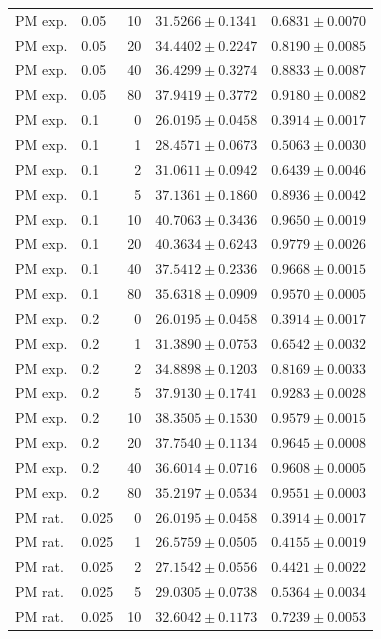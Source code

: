 \begin{longtable}{llrll}
PM exp. & 0.05 & 10 & $31.5266 \pm 0.1341$ & $0.6831 \pm 0.0070$ \\
PM exp. & 0.05 & 20 & $34.4402 \pm 0.2247$ & $0.8190 \pm 0.0085$ \\
PM exp. & 0.05 & 40 & $36.4299 \pm 0.3274$ & $0.8833 \pm 0.0087$ \\
PM exp. & 0.05 & 80 & $37.9419 \pm 0.3772$ & $0.9180 \pm 0.0082$ \\
PM exp. & 0.1 & 0 & $26.0195 \pm 0.0458$ & $0.3914 \pm 0.0017$ \\
PM exp. & 0.1 & 1 & $28.4571 \pm 0.0673$ & $0.5063 \pm 0.0030$ \\
PM exp. & 0.1 & 2 & $31.0611 \pm 0.0942$ & $0.6439 \pm 0.0046$ \\
PM exp. & 0.1 & 5 & $37.1361 \pm 0.1860$ & $0.8936 \pm 0.0042$ \\
PM exp. & 0.1 & 10 & $40.7063 \pm 0.3436$ & $0.9650 \pm 0.0019$ \\
PM exp. & 0.1 & 20 & $40.3634 \pm 0.6243$ & $0.9779 \pm 0.0026$ \\
PM exp. & 0.1 & 40 & $37.5412 \pm 0.2336$ & $0.9668 \pm 0.0015$ \\
PM exp. & 0.1 & 80 & $35.6318 \pm 0.0909$ & $0.9570 \pm 0.0005$ \\
PM exp. & 0.2 & 0 & $26.0195 \pm 0.0458$ & $0.3914 \pm 0.0017$ \\
PM exp. & 0.2 & 1 & $31.3890 \pm 0.0753$ & $0.6542 \pm 0.0032$ \\
PM exp. & 0.2 & 2 & $34.8898 \pm 0.1203$ & $0.8169 \pm 0.0033$ \\
PM exp. & 0.2 & 5 & $37.9130 \pm 0.1741$ & $0.9283 \pm 0.0028$ \\
PM exp. & 0.2 & 10 & $38.3505 \pm 0.1530$ & $0.9579 \pm 0.0015$ \\
PM exp. & 0.2 & 20 & $37.7540 \pm 0.1134$ & $0.9645 \pm 0.0008$ \\
PM exp. & 0.2 & 40 & $36.6014 \pm 0.0716$ & $0.9608 \pm 0.0005$ \\
PM exp. & 0.2 & 80 & $35.2197 \pm 0.0534$ & $0.9551 \pm 0.0003$ \\
PM rat. & 0.025 & 0 & $26.0195 \pm 0.0458$ & $0.3914 \pm 0.0017$ \\
PM rat. & 0.025 & 1 & $26.5759 \pm 0.0505$ & $0.4155 \pm 0.0019$ \\
PM rat. & 0.025 & 2 & $27.1542 \pm 0.0556$ & $0.4421 \pm 0.0022$ \\
PM rat. & 0.025 & 5 & $29.0305 \pm 0.0738$ & $0.5364 \pm 0.0034$ \\
PM rat. & 0.025 & 10 & $32.6042 \pm 0.1173$ & $0.7239 \pm 0.0053$ \\

\end{longtable}
